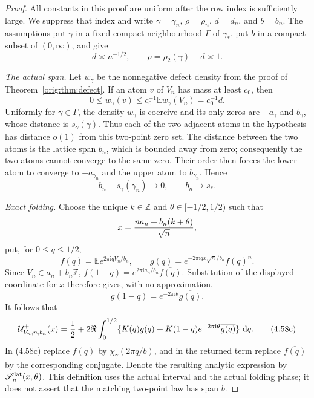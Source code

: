 \documentclass[11pt,a4paper]{article}
\numberwithin{equation}{section}
\theoremstyle{definition}
\theoremstyle{remark}
\newcommand{\E}{\mathbb E}
\newcommand{\ii}{\mathrm i}
\newcommand{\dd}{\,\mathrm d}
\begin{document}
\begin{proof}
All constants in this proof are uniform after the row index is sufficiently
large.  We suppress that index and write
\(\gamma=\gamma_n\), \(\rho=\rho_n\), \(d=d_n\), and \(b=b_n\).
The assumptions put \(\gamma\) in a fixed compact neighbourhood
\(\Gamma\) of \(\gamma_*\), put \(b\) in a compact subset of
\((0,\infty)\), and give
\[
             d\asymp n^{-1/2},\qquad
             \rho=\rho_2(\gamma)+d\asymp1.            \tag{4.58b0}
\]

\emph{The actual span.}
Let \(w_\gamma\) be the nonnegative defect density from the proof of
Theorem~\ref{orig:thm:defect}.  If an atom \(v\) of \(V_n\) has mass at least
\(c_0\), then
\[
       0\le w_\gamma(v)\le c_0^{-1}\E w_\gamma(V_n)
                         =c_0^{-1}d.                 \tag{4.58b1}
\]
Uniformly for \(\gamma\in\Gamma\), the density \(w_\gamma\) is coercive
and its only zeros are
\(-a_\gamma\) and \(b_\gamma\), whose distance is
\(s_\gamma(\gamma)\).  Thus each of the two adjacent atoms in the
hypothesis has distance \(o(1)\) from this two-point zero set.  The
distance between the two atoms is the lattice span \(b_n\), which is
bounded away from zero; consequently the two atoms cannot converge to
the same zero.  Their order then forces the lower atom to converge to
\(-a_{\gamma_n}\) and the upper atom to \(b_{\gamma_n}\).  Hence
\[
                 b_n-s_\gamma(\gamma_n)\longrightarrow0,
        \qquad b_n\longrightarrow s_*.               \tag{4.58b}
\]

\emph{Exact folding.}
Choose the unique \(k\in\mathbb Z\) and
\(\theta\in[-1/2,1/2)\) such that
\[
 x={na_n+b_n(k+\theta)\over\sqrt n},
\]
put, for \(0\le q\le1/2\),
\[
 f(q)=\E e^{2\pi\ii qV_n/b_n},\qquad
 g(q)=e^{-2\pi\ii qx\sqrt n/b_n}f(q)^n.
\]
Since \(V_n\in a_n+b_n\mathbb Z\),
\(f(1-q)=e^{2\pi\ii a_n/b_n}\overline{f(q)}\).  Substitution of the
displayed coordinate for \(x\) therefore gives, with no approximation,
\[
              g(1-q)=e^{-2\pi\ii\theta}\overline{g(q)}.
\]
It follows that
\[
 \mathcal U^+_{V_n,n,b_n}(x)={1\over2}+2\Re\int_0^{1/2}
 \{K(q)g(q)+K(1-q)e^{-2\pi\ii\theta}\overline{g(q)}\}\,\dd q.
                                                               \tag{4.58c}
\]
In (4.58c) replace \(f(q)\) by
\(\chi_\gamma(2\pi q/b)\), and in the returned term replace
\(\overline{f(q)}\) by the corresponding conjugate.  Denote the resulting
analytic expression by \(\mathscr S_n^{\rm lat}(x,\theta)\).  This
definition uses the actual interval and the actual folding phase; it does
not assert that the matching two-point law has span \(b\).


\end{proof}
\end{document}
